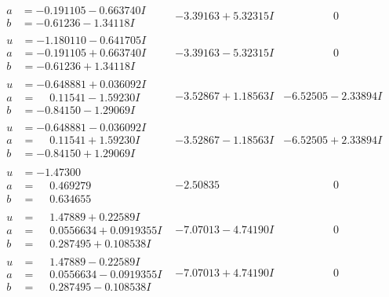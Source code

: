 \documentclass[1p]{elsarticle_modified}
\theoremstyle{definition}
\begin{document}
$$\begin{array}{c|c|c}
\begin{aligned}
a &= -0.191105 - 0.663740 I \\
b &= -0.61236 - 1.34118 I\end{aligned}
 & -3.39163 + 5.32315 I & \phantom{-0.000000 } 0 \\ \hline\begin{aligned}
u &= -1.180110 - 0.641705 I \\
a &= -0.191105 + 0.663740 I \\
b &= -0.61236 + 1.34118 I\end{aligned}
 & -3.39163 - 5.32315 I & \phantom{-0.000000 } 0 \\ \hline\begin{aligned}
u &= -0.648881 + 0.036092 I \\
a &= \phantom{-}0.11541 - 1.59230 I \\
b &= -0.84150 - 1.29069 I\end{aligned}
 & -3.52867 + 1.18563 I & -6.52505 - 2.33894 I \\ \hline\begin{aligned}
u &= -0.648881 - 0.036092 I \\
a &= \phantom{-}0.11541 + 1.59230 I \\
b &= -0.84150 + 1.29069 I\end{aligned}
 & -3.52867 - 1.18563 I & -6.52505 + 2.33894 I \\ \hline\begin{aligned}
u &= -1.47300\phantom{ +0.000000I} \\
a &= \phantom{-}0.469279\phantom{ +0.000000I} \\
b &= \phantom{-}0.634655\phantom{ +0.000000I}\end{aligned}
 & -2.50835\phantom{ +0.000000I} & \phantom{-0.000000 } 0 \\ \hline\begin{aligned}
u &= \phantom{-}1.47889 + 0.22589 I \\
a &= \phantom{-}0.0556634 + 0.0919355 I \\
b &= \phantom{-}0.287495 + 0.108538 I\end{aligned}
 & -7.07013 - 4.74190 I & \phantom{-0.000000 } 0 \\ \hline\begin{aligned}
u &= \phantom{-}1.47889 - 0.22589 I \\
a &= \phantom{-}0.0556634 - 0.0919355 I \\
b &= \phantom{-}0.287495 - 0.108538 I\end{aligned}
 & -7.07013 + 4.74190 I & \phantom{-0.000000 } 0 \\ \hline\begin{aligned}

\end{aligned}
\end{array}$$
\end{document}

